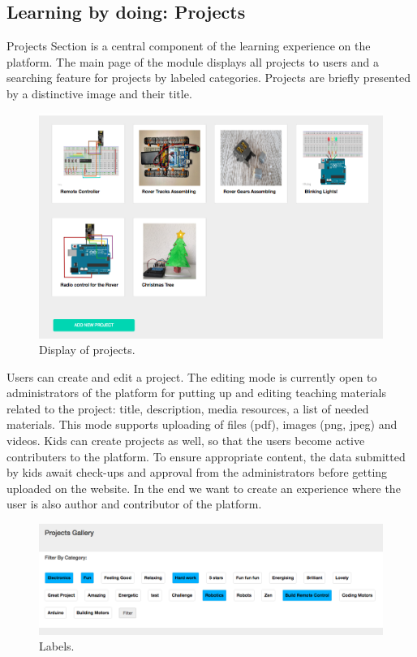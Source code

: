 \subsection{Learning by doing: Projects}

Projects Section is a central component of the learning experience on the platform.
The main page of the module displays all projects to users and a searching feature for projects by labeled categories. Projects are briefly presented by a distinctive image and their title. \\

\begin{figure}
\includegraphics[width=1\linewidth]{images/ui/DisplayProjects.png}
\caption{Display of projects.}
\label{fig:projects_display}
\end{figure}

Users can create and edit a project. The editing mode is currently open to administrators of the platform for putting up and editing teaching materials related to the project: title, description, media resources, a list of needed materials. This mode supports uploading of files (pdf), images (png, jpeg) and videos.
Kids can create projects as well, so that the users become active contributers to the platform. To ensure appropriate content, the data submitted by kids await check-ups and approval from the administrators before getting uploaded on the website.
In the end we want to create an experience where the user is also author and contributor of the platform. \\

\begin{figure}
\includegraphics[width=1\linewidth]{images/ui/Labels.png}
\caption{Labels.}
\label{fig:labels}
\end{figure}

